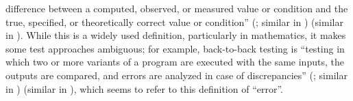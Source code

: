 \begin{enumerate}
          difference between a computed, observed, or measured value or
          condition and the true, specified, or theoretically correct value
          or condition'' \ifnotpaper (\citealp[p.~128]{IEEE2010}; similar in
              \citealp[pp.~17\=/18 to 17\=/19, 18\=/7 to 18\=/8]{SWEBOK2024})%
          \else \cite[p.~128]{IEEE2010} (similar in
              \cite[pp.~17\=/18 to 17\=/19, 18\=/7 to 18\=/8]{SWEBOK2024})\fi.
          While this is a widely used definition, particularly in mathematics,
          it makes some test approaches ambiguous; for example, back-to-back
          testing is ``testing in which two or more variants of a program are
          executed with the same inputs, the outputs are compared, and errors
          are analyzed in case of discrepancies'' \ifnotpaper
              (\citealp[p.~30]{IEEE2010}; similar in \citealpISTQB{})\else
              \cite[p.~30]{IEEE2010} (similar in \cite{ISTQB})\fi,
          which seems to refer to this definition of ``error''.


\end{enumerate}
